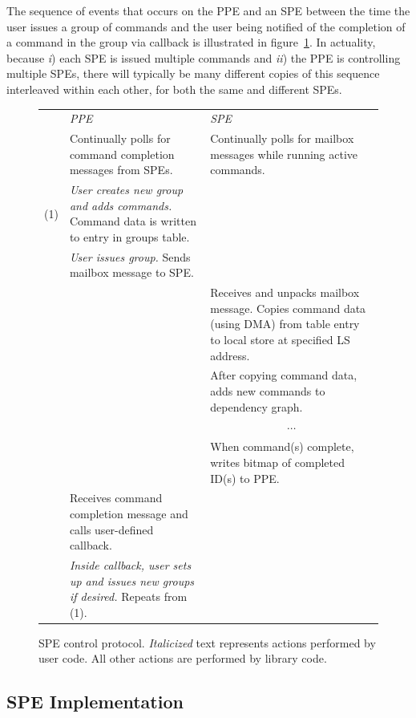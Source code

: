 The sequence of events that occurs on the PPE and an SPE between the time the user issues a group of commands and the user being notified of the completion of a command in the group via callback is illustrated in figure~\ref{fig:lib:control}. In actuality, because \emph{i}) each SPE is issued multiple commands and \emph{ii}) the PPE is controlling multiple SPEs, there will typically be many different copies of this sequence interleaved within each other, for both the same and different SPEs.

\begin{figure}[!htb]
\begin{center}
\begin{tabular}{rp{2.5in}p{2.5in}}
& \emph{PPE} & \emph{SPE} \\
\cline{2-3}
& Continually polls for command completion messages from SPEs. & Continually polls for mailbox messages while running active commands. \\
\cline{2-3}
\textsf{(1)} & \emph{User creates new group and adds commands.} Command data is written to entry in groups table. & \\
& \emph{User issues group.} Sends mailbox message to SPE. & \\
& & Receives and unpacks mailbox message. Copies command data (using DMA) from table entry to local store at specified LS address. \\
& & After copying command data, adds new commands to dependency graph. \\
& & \multicolumn{1}{c}{$\cdots$} \\
& & When command(s) complete, writes bitmap of completed ID(s) to PPE. \\
& Receives command completion message and calls user-defined callback. & \\
& \emph{Inside callback, user sets up and issues new groups if desired.} Repeats from \textsf{(1)}. &
\end{tabular}
\end{center}
\caption[SPE control protocol.]{SPE control protocol. \emph{Italicized} text represents actions performed by user code. All other actions are performed by library code.}
\label{fig:lib:control}
\end{figure}

\subsection{SPE Implementation}

